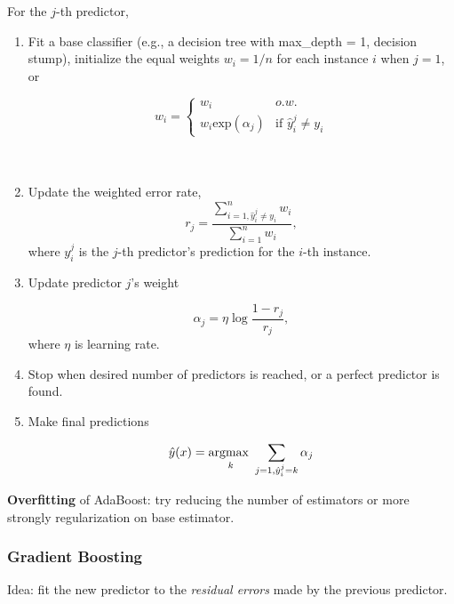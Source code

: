 \documentclass[12pt,oneside,a4paper]{article}
\numberwithin{equation}{section}
\newcommand{\argmax}[1]{\stackunder{\textrm{argmax }}{\scriptsize$#1$}}
\begin{document}
For the $j$-th predictor, 
\begin{enumerate}
\item Fit a base classifier (e.g., a decision tree with max\_depth = 1, decision stump), initialize the equal weights $w_i = 1/n$ for each instance $i$ when $j=1$, or

\begin{equation}
w_i = \left\{ 
\begin{array}{ll}
w_i & o.w.\\
w_i \textrm{exp}(\alpha_j) & \textrm{if $\hat{y}_i^j \neq y_i$}
\end{array}
\right.
\end{equation}
\\~\\

\item Update the weighted error rate,
\begin{equation}
r_j = \frac{\sum_{i=1, \hat{y}_i^j \neq y_i}^{n}w_i}{\sum_{i=1}^{n}w_i},
\end{equation}
where $y_i^j$ is the $j$-th predictor's prediction for the $i$-th instance.


\item Update predictor $j$'s weight

\begin{equation}
\alpha_j = \eta \log \frac{1 - r_j}{r_j},
\end{equation}
where $\eta$ is learning rate. 

\item Stop when desired number of predictors is reached, or a perfect predictor is found. 

\item Make final predictions 

\begin{equation}
\hat{y}(x) = \argmax{k} \sum_{j = 1, \hat{y}_i^j = k} \alpha_j
\end{equation}
\end{enumerate} 

\textbf{Overfitting} of AdaBoost: try reducing the number of estimators or more strongly regularization on base estimator. 


\subsubsection{Gradient Boosting}

Idea: fit the new predictor to the \emph{residual errors} made by the previous predictor. 
\end{document}
